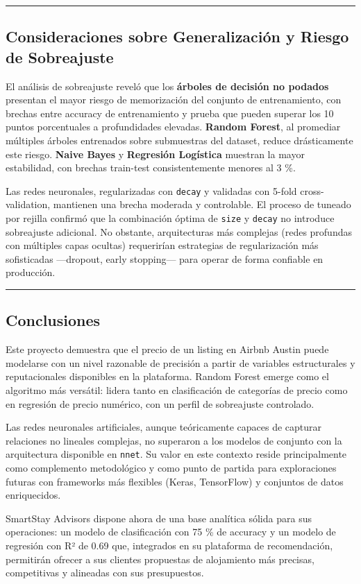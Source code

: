 \documentclass[
]{article}
\begin{document}
\begin{center}\rule{0.5\linewidth}{0.5pt}\end{center}

\subsection{Consideraciones sobre Generalización y Riesgo de
Sobreajuste}\label{consideraciones-sobre-generalizaciuxf3n-y-riesgo-de-sobreajuste}

El análisis de sobreajuste reveló que los \textbf{árboles de decisión no
podados} presentan el mayor riesgo de memorización del conjunto de
entrenamiento, con brechas entre accuracy de entrenamiento y prueba que
pueden superar los 10 puntos porcentuales a profundidades elevadas.
\textbf{Random Forest}, al promediar múltiples árboles entrenados sobre
submuestras del dataset, reduce drásticamente este riesgo. \textbf{Naive
Bayes} y \textbf{Regresión Logística} muestran la mayor estabilidad, con
brechas train-test consistentemente menores al 3 \%.

Las redes neuronales, regularizadas con \texttt{decay} y validadas con
5-fold cross-validation, mantienen una brecha moderada y controlable. El
proceso de tuneado por rejilla confirmó que la combinación óptima de
\texttt{size} y \texttt{decay} no introduce sobreajuste adicional. No
obstante, arquitecturas más complejas (redes profundas con múltiples
capas ocultas) requerirían estrategias de regularización más
sofisticadas ---dropout, early stopping--- para operar de forma
confiable en producción.

\begin{center}\rule{0.5\linewidth}{0.5pt}\end{center}

\subsection{Conclusiones}\label{conclusiones}

Este proyecto demuestra que el precio de un listing en Airbnb Austin
puede modelarse con un nivel razonable de precisión a partir de
variables estructurales y reputacionales disponibles en la plataforma.
Random Forest emerge como el algoritmo más versátil: lidera tanto en
clasificación de categorías de precio como en regresión de precio
numérico, con un perfil de sobreajuste controlado.

Las redes neuronales artificiales, aunque teóricamente capaces de
capturar relaciones no lineales complejas, no superaron a los modelos de
conjunto con la arquitectura disponible en \texttt{nnet}. Su valor en
este contexto reside principalmente como complemento metodológico y como
punto de partida para exploraciones futuras con frameworks más flexibles
(Keras, TensorFlow) y conjuntos de datos enriquecidos.

SmartStay Advisors dispone ahora de una base analítica sólida para sus
operaciones: un modelo de clasificación con 75 \% de accuracy y un
modelo de regresión con R² de 0.69 que, integrados en su plataforma de
recomendación, permitirán ofrecer a sus clientes propuestas de
alojamiento más precisas, competitivas y alineadas con sus presupuestos.
\end{document}
